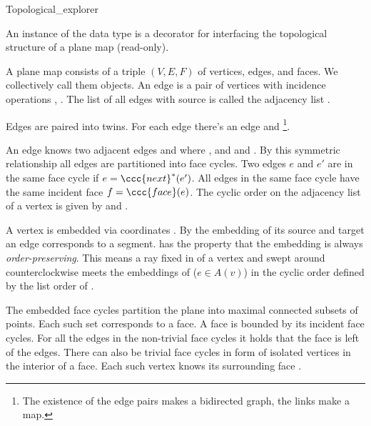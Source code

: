 
\begin{ccRefClass}{Topological_explorer}

\ccDefinition

An instance  of the data type  is a
decorator for interfacing the topological structure of a plane map
 (read-only).

A plane map  consists of a triple $(V, E, F)$ of vertices,
edges, and faces. We collectively call them objects. An edge 
is a pair of vertices  with incidence operations , . The list of all edges with source
 is called the adjacency list .

Edges are paired into twins. For each edge  there's an
edge  and \footnote{The
existence of the edge pairs makes  a bidirected graph, the
 links make  a map.}.

An edge  knows two adjacent edges 
and  where ,
 and  and . By this symmetric  relationship all edges are
partitioned into face cycles.  Two edges $e$ and $e'$ are in the same
face cycle if $e = \ccc{next}^*(e')$.  All edges  in the same
face cycle have the same incident face $f = \ccc{face}(e)$. The cyclic
order on the adjacency list of a vertex  is given
by  and
.

A vertex  is embedded via coordinates . By the
embedding of its source and target an edge corresponds to a
segment.  has the property that the embedding is always
\emph{order-preserving}.  This means a ray fixed in  of
a vertex  and swept around counterclockwise meets the
embeddings of  ($e \in A(v)$) in the cyclic order
defined by the list order of .

The embedded face cycles partition the plane into maximal connected
subsets of points. Each such set corresponds to a face. A face is
bounded by its incident face cycles. For all the edges in the
non-trivial face cycles it holds that the face is left of the edges.
There can also be trivial face cycles in form of isolated vertices in
the interior of a face. Each such vertex  knows its surrounding
face . 


\end{ccRefClass}
